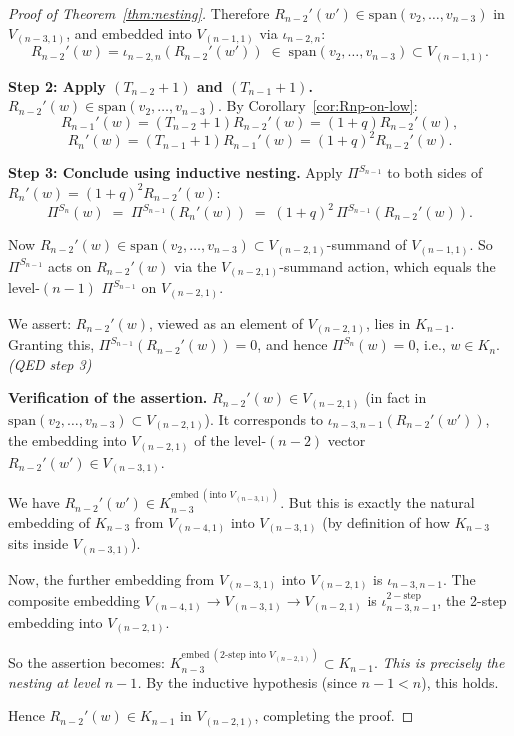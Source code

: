 \documentclass[11pt]{article}
\theoremstyle{definition}
\begin{document}
\begin{proof}[Proof of Theorem~\ref{thm:nesting}]
Therefore $R_{n-2}'(w') \in \mathrm{span}(v_2,\ldots,v_{n-3})$ in
$V_{(n-3,1)}$, and embedded into $V_{(n-1,1)}$ via $\iota_{n-2,n}$:
\[
   R_{n-2}'(w) = \iota_{n-2,n}(R_{n-2}'(w'))
     \;\in\; \mathrm{span}(v_2,\ldots,v_{n-3}) \subset V_{(n-1,1)}.
\]

\textbf{Step 2: Apply $(T_{n-2}+1)$ and $(T_{n-1}+1)$.}
$R_{n-2}'(w) \in \mathrm{span}(v_2,\ldots, v_{n-3})$. By
Corollary~\ref{cor:Rnp-on-low}:
\[
   R_{n-1}'(w) = (T_{n-2}+1) R_{n-2}'(w) = (1+q) R_{n-2}'(w),
\]
\[
   R_n'(w) = (T_{n-1}+1) R_{n-1}'(w) = (1+q)^2 R_{n-2}'(w).
\]

\textbf{Step 3: Conclude using inductive nesting.}
Apply $\Pi^{S_{n-1}}$ to both sides of $R_n'(w) = (1+q)^2 R_{n-2}'(w)$:
\[
   \Pi^{S_n}(w) \;=\; \Pi^{S_{n-1}}(R_n'(w))
              \;=\; (1+q)^2 \, \Pi^{S_{n-1}}(R_{n-2}'(w)).
\]

Now $R_{n-2}'(w) \in \mathrm{span}(v_2,\ldots, v_{n-3})
\subset V_{(n-2,1)}$-summand of $V_{(n-1,1)}$. So
$\Pi^{S_{n-1}}$ acts on $R_{n-2}'(w)$ via the
$V_{(n-2,1)}$-summand action, which equals the level-$(n-1)$
$\Pi^{S_{n-1}}$ on $V_{(n-2,1)}$.

We assert: $R_{n-2}'(w)$, viewed as an element of $V_{(n-2,1)}$,
lies in $K_{n-1}$. Granting this, $\Pi^{S_{n-1}}(R_{n-2}'(w)) = 0$,
and hence $\Pi^{S_n}(w) = 0$, i.e., $w \in K_n$. \quad \emph{(QED step 3)}

\textbf{Verification of the assertion.}
$R_{n-2}'(w) \in V_{(n-2,1)}$ (in fact in $\mathrm{span}(v_2,\ldots,
v_{n-3}) \subset V_{(n-2,1)}$). It corresponds to
$\iota_{n-3,n-1}(R_{n-2}'(w'))$, the embedding into $V_{(n-2,1)}$ of
the level-$(n-2)$ vector $R_{n-2}'(w') \in V_{(n-3,1)}$.

We have $R_{n-2}'(w') \in K_{n-3}^{\mathrm{embed}\ (\text{into }V_{(n-3,1)})}$.
But this is exactly the natural embedding of $K_{n-3}$ from
$V_{(n-4,1)}$ into $V_{(n-3,1)}$ (by definition of how $K_{n-3}$
sits inside $V_{(n-3,1)}$).

Now, the further embedding from $V_{(n-3,1)}$ into $V_{(n-2,1)}$ is
$\iota_{n-3,n-1}$. The composite embedding
$V_{(n-4,1)} \to V_{(n-3,1)} \to V_{(n-2,1)}$ is
$\iota_{n-3,n-1}^{\mathrm{2-step}}$, the 2-step embedding into
$V_{(n-2,1)}$.

So the assertion becomes: $K_{n-3}^{\mathrm{embed}\ (\text{2-step into } V_{(n-2,1)})}
\subset K_{n-1}$. \emph{This is precisely the nesting at level $n-1$.}
By the inductive hypothesis (since $n-1 < n$), this holds.

Hence $R_{n-2}'(w) \in K_{n-1}$ in $V_{(n-2,1)}$, completing the proof. \qedhere
\end{proof}
\end{document}
